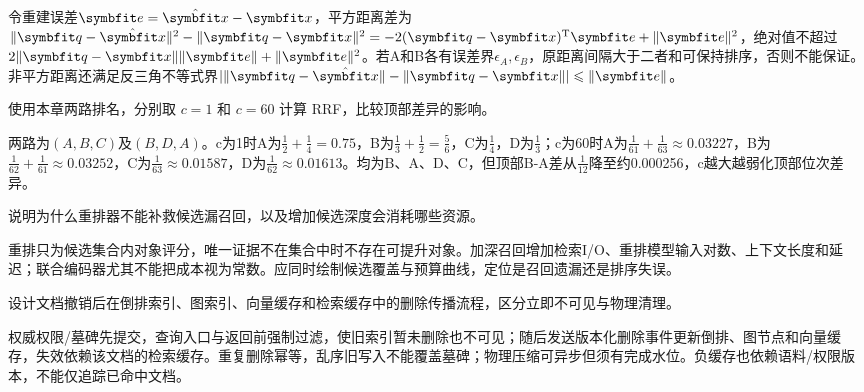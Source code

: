 \begin{exercises}
\begin{exercise}
\begin{solution}
令重建误差$\vect{e}=\hat{\vect{x}}-\vect{x}$，平方距离差为 $\|\vect{q}-\hat{\vect{x}}\|^2-\|\vect{q}-\vect{x}\|^2=-2(\vect{q}-\vect{x})^{\mathrm{T}}\vect{e}+\|\vect{e}\|^2$，绝对值不超过 $2\|\vect{q}-\vect{x}\|\|\vect{e}\|+\|\vect{e}\|^2$。若A和B各有误差界$\epsilon_A,\epsilon_B$，原距离间隔大于二者和可保持排序，否则不能保证。非平方距离还满足反三角不等式界$|\|\vect{q}-\hat{\vect{x}}\|-\|\vect{q}-\vect{x}\||\le\|\vect{e}\|$。
\end{solution}
\end{exercise}

\begin{exercise} 使用本章两路排名，分别取 $c=1$ 和 $c=60$ 计算 RRF，比较顶部差异的影响。

\begin{solution}
两路为$(A,B,C)$及$(B,D,A)$。c为1时A为$\frac{1}{2}+\frac{1}{4}=0.75$，B为$\frac{1}{3}+\frac{1}{2}=\frac{5}{6}$，C为$\frac{1}{4}$，D为$\frac{1}{3}$；c为60时A为$\frac{1}{61}+\frac{1}{63}\approx0.03227$，B为$\frac{1}{62}+\frac{1}{61}\approx0.03252$，C为$\frac{1}{63}\approx0.01587$，D为$\frac{1}{62}\approx0.01613$。均为B、A、D、C，但顶部B-A差从$\frac{1}{12}$降至约0.000256，c越大越弱化顶部位次差异。
\end{solution}
\end{exercise}

\begin{exercise} 说明为什么重排器不能补救候选漏召回，以及增加候选深度会消耗哪些资源。

\begin{solution}
重排只为候选集合内对象评分，唯一证据不在集合中时不存在可提升对象。加深召回增加检索I/O、重排模型输入对数、上下文长度和延迟；联合编码器尤其不能把成本视为常数。应同时绘制候选覆盖与预算曲线，定位是召回遗漏还是排序失误。
\end{solution}
\end{exercise}

\begin{exercise} 设计文档撤销后在倒排索引、图索引、向量缓存和检索缓存中的删除传播流程，区分立即不可见与物理清理。

\begin{solution}
权威权限/墓碑先提交，查询入口与返回前强制过滤，使旧索引暂未删除也不可见；随后发送版本化删除事件更新倒排、图节点和向量缓存，失效依赖该文档的检索缓存。重复删除幂等，乱序旧写入不能覆盖墓碑；物理压缩可异步但须有完成水位。负缓存也依赖语料/权限版本，不能仅追踪已命中文档。
\end{solution}
\end{exercise}


\end{exercises}
